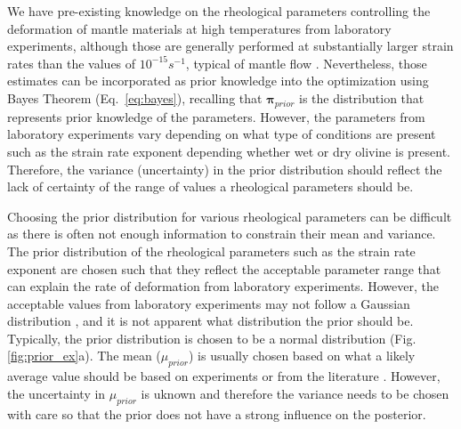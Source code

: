 \documentclass[12pt]{article}
\newcommand{\ppi}{{\ensuremath{\boldsymbol{\pi}}}}
\begin{document}
{ We have pre-existing knowledge on the rheological parameters controlling the deformation of mantle materials at high temperatures from laboratory experiments\cite{ranalli1995rheology}, 
although those are generally performed at substantially larger strain rates than the values of $10^{-15}s^{-1}$, typical of mantle flow \citep{korenaga2008new}. Nevertheless,  those estimates can be  incorporated as prior knowledge into the optimization using Bayes Theorem (Eq.~\eqref{eq:bayes}), recalling that $\ppi_{prior}$ is the distribution that represents prior knowledge of the parameters. However, the parameters from laboratory experiments vary depending on what type of conditions are present such as the strain rate exponent depending whether wet or dry olivine is present. Therefore, the variance (uncertainty) in the prior distribution should reflect the lack of certainty of the range of values a rheological parameters should be.

Choosing the prior distribution for various rheological parameters can be difficult as there is often not enough information to constrain their mean and variance. The prior distribution of the rheological parameters such as the strain rate exponent are chosen such that they reflect the acceptable parameter range that can explain the rate of deformation from laboratory experiments. However, the acceptable values from laboratory experiments may not follow a Gaussian distribution \citep{korenaga2008new}, 
and it is not apparent what distribution the prior should be.  Typically, the prior distribution is chosen to be a normal distribution (Fig.\ref{fig:prior_ex}a).
The mean ($\mu_{prior}$) is usually chosen based on what a likely average value should be based on experiments or from  the literature \citep{korenaga2008new}. However, the uncertainty in $\mu_{prior}$ is uknown and therefore the variance needs to be chosen with care so that the prior does not have a strong influence on the posterior.    %
\begin{figure}[H]
\centering
\hspace{-1.2cm}
\end{figure}}
\end{document}
